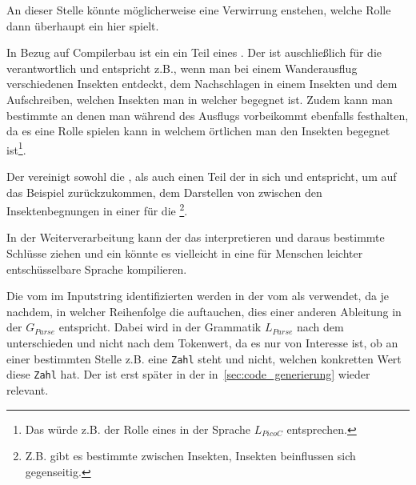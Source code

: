 \begin{Special_Paragraph}
  An dieser Stelle könnte möglicherweise eine Verwirrung enstehen, welche Rolle dann überhaupt ein  hier spielt.

  In Bezug auf Compilerbau ist ein  ein Teil eines . Der  ist auschließlich für die  verantwortlich und entspricht z.B., wenn man bei einem Wanderausflug verschiedenen Insekten entdeckt, dem Nachschlagen in einem Insekten und dem Aufschreiben, welchen Insekten man in welcher  begegnet ist. Zudem kann man bestimmte  an denen man während des Ausflugs vorbeikommt ebenfalls festhalten, da es eine Rolle spielen kann in welchem örtlichen  man den Insekten begegnet ist\footnote{Das würde z.B. der Rolle eines  \smalltt{;} in der Sprache $L_{PicoC}$ entsprechen.}.

  Der  vereinigt sowohl die , als auch einen Teil der  in sich und entspricht, um auf das Beispiel zurückzukommen, dem Darstellen von  zwischen den Insektenbegnungen in einer für die \footnote{Z.B. gibt es bestimmte  zwischen Insekten, Insekten beinflussen sich gegenseitig.}.

  In der Weiterverarbeitung kann der  das interpretieren und daraus bestimmte Schlüsse ziehen und ein   könnte es vielleicht in eine für Menschen leichter entschüsselbare Sprache kompilieren.
\end{Special_Paragraph}

Die vom  im Inputstring identifizierten  werden in der  vom  als  verwendet, da je nachdem, in welcher Reihenfolge die  auftauchen, dies einer anderen Ableitung in der  $G_{Parse}$ entspricht. Dabei wird in der Grammatik $L_{Parse}$ nach dem  unterschieden und nicht nach dem Tokenwert, da es nur von Interesse ist, ob an einer bestimmten Stelle z.B. eine \verb|Zahl| steht und nicht, welchen konkretten Wert diese \verb|Zahl| hat. Der  ist erst später in der  in~\ref{sec:code_generierung} wieder relevant.

